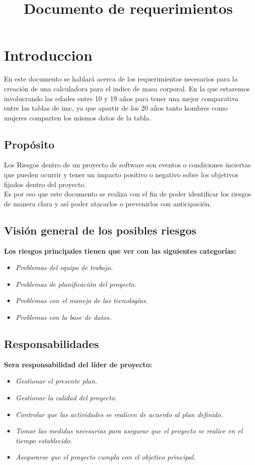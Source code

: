 \documentclass[12pt,a4paper]{article}
\begin{document}
\title{Documento de requerimientos} 

 
\vspace{1 cm}
\section{Introduccion}
	En este documento se hablará acerca de los requerimientos necesarios para la creación de una calculadora para el indice de masa corporal. En la que estaremos involucrando las edades entre 10 y 19 años para tener una mejor comparativa entre las tablas de imc, ya que apartir de los 20 años tanto hombres como mujeres comparten los mismos datos de la tabla.\\
\subsection{Propósito}
Los Riesgos dentro de un proyecto de software son eventos o condiciones inciertas que pueden ocurrir y tener un impacto positivo o negativo sobre los objetivos fijados dentro del proyecto.\\
Es por eso que este documento se realiza con el fin de poder identificar los riesgos de manera clara y así poder atacarlos o prevenirlos con anticipación.\\
\subsection{Visión general de los posibles riesgos}
\textbf {Los riesgos principales tienen que ver con las siguientes categorías:} \\
\begin{itemize}
\item \textit{Problemas del equipo de trabajo.}
\item \textit{Problemas de planificación del proyecto.}
\item \textit{Problemas con el manejo de las tecnologías.}
\item \textit{Problemas con la base de datos.}
\end{itemize}

\subsection{Responsabilidades}
\textbf {Sera responsabilidad del líder de proyecto:} \\
\begin{itemize}
\item \textit{Gestionar el presente plan.}
\item \textit{Gestionar la calidad del proyecto.}
\item \textit{Controlar que las actividades se realicen de acuerdo al plan definido.}
\item \textit{Tomar las medidas necesarias para asegurar que el proyecto se realice en el tiempo establecido.}
\item \textit{Asegurarse que el proyecto cumpla con el objetivo principal.}
\end{itemize}
\vspace{1 cm}
\end{document}
